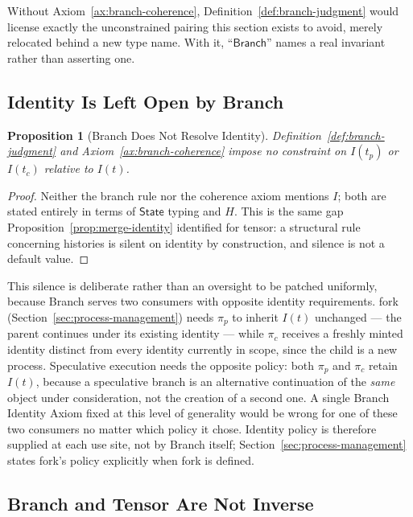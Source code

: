 \documentclass[11pt]{article}
\newtheorem{proposition}{Proposition}[section]
\begin{document}
Without Axiom~\ref{ax:branch-coherence}, Definition~\ref{def:branch-judgment} would license exactly the unconstrained pairing this section exists to avoid, merely relocated behind a new type name. With it, ``$\mathsf{Branch}$'' names a real invariant rather than asserting one.

\subsection{Identity Is Left Open by Branch}

\begin{proposition}[Branch Does Not Resolve Identity]
\label{prop:branch-identity-open}
Definition~\ref{def:branch-judgment} and Axiom~\ref{ax:branch-coherence} impose no constraint on $I(t_p)$ or $I(t_c)$ relative to $I(t)$.
\end{proposition}
\begin{proof}
Neither the branch rule nor the coherence axiom mentions $I$; both are stated entirely in terms of $\mathsf{State}$ typing and $H$. This is the same gap Proposition~\ref{prop:merge-identity} identified for tensor: a structural rule concerning histories is silent on identity by construction, and silence is not a default value.
\end{proof}

This silence is deliberate rather than an oversight to be patched uniformly, because Branch serves two consumers with opposite identity requirements. fork (Section~\ref{sec:process-management}) needs $\pi_p$ to inherit $I(t)$ unchanged --- the parent continues under its existing identity --- while $\pi_c$ receives a freshly minted identity distinct from every identity currently in scope, since the child is a new process. Speculative execution needs the opposite policy: both $\pi_p$ and $\pi_c$ retain $I(t)$, because a speculative branch is an alternative continuation of the \emph{same} object under consideration, not the creation of a second one. A single Branch Identity Axiom fixed at this level of generality would be wrong for one of these two consumers no matter which policy it chose. Identity policy is therefore supplied at each use site, not by Branch itself; Section~\ref{sec:process-management} states fork's policy explicitly when fork is defined.

\subsection{Branch and Tensor Are Not Inverse}
\end{document}
